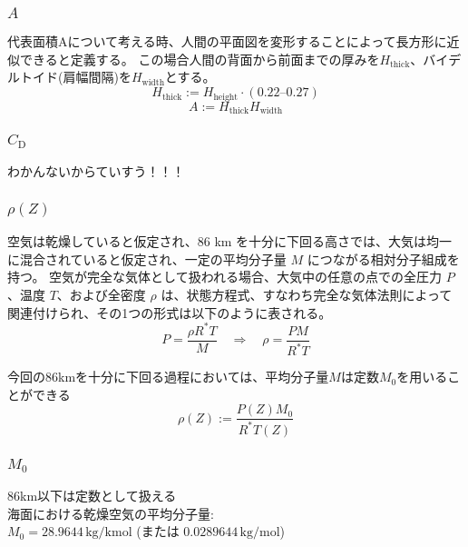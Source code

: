 \documentclass[a4paper,12pt]{article}
\begin{document}
\subsubsection{$A$}
代表面積Aについて考える時、人間の平面図を変形することによって長方形に近似できると定義する。
この場合人間の背面から前面までの厚みを$H_{\mathrm{thick}}$、バイデルトイド(肩幅間隔)を$H_{\mathrm{width}}$とする。
\[
H_{\mathrm{thick}} := H_{\mathrm{height}} \cdot (0.22 \text{--} 0.27)
\]
\[
A := H_{\mathrm{thick}} H_{\mathrm{width}}
\]

\subsubsection{$C_{\mathrm{D}}$}
わかんないからていすう！！！ %


\subsubsection{$\rho(Z)$}
空気は乾燥していると仮定され、86 km を十分に下回る高さでは、大気は均一に混合されていると仮定され、一定の平均分子量 $M$ につながる相対分子組成を持つ。
空気が完全な気体として扱われる場合、大気中の任意の点での全圧力 $P$、温度 $T$、および全密度 $\rho$ は、状態方程式、すなわち完全な気体法則によって関連付けられ、その1つの形式は以下のように表される。
\[
P = \frac{\rho R^* T}{M} \quad \Rightarrow \quad \rho = \frac{P M}{R^* T}
\]

今回の86kmを十分に下回る過程においては、平均分子量$M$は定数$M_0$を用いることができる
\[
  \rho(Z) := \frac{P(Z) M_0}{R^* T(Z)}
\]

\subsubsection{$M_0$}
86km以下は定数として扱える\\
海面における乾燥空気の平均分子量:\\ $M_0 = 28.9644 \, \mathrm{kg/kmol}$ (または $0.0289644 \, \mathrm{kg/mol}$)\\\\
\end{document}
